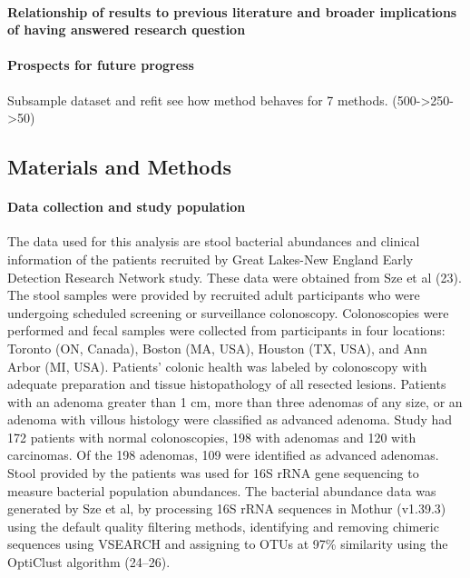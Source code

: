\documentclass[11pt,]{article}
\let\oldparagraph\paragraph
\renewcommand{\paragraph}[1]{\oldparagraph{#1}\mbox{}}
\begin{document}
\paragraph{Relationship of results to previous literature and broader
implications of having answered research
question}\label{relationship-of-results-to-previous-literature-and-broader-implications-of-having-answered-research-question}

\paragraph{Prospects for future
progress}\label{prospects-for-future-progress}

Subsample dataset and refit see how method behaves for 7 methods.
(500-\textgreater{}250-\textgreater{}50)

\subsection{Materials and Methods}\label{materials-and-methods}

\paragraph{Data collection and study
population}\label{data-collection-and-study-population}

The data used for this analysis are stool bacterial abundances and
clinical information of the patients recruited by Great Lakes-New
England Early Detection Research Network study. These data were obtained
from Sze et al (23). The stool samples were provided by recruited adult
participants who were undergoing scheduled screening or surveillance
colonoscopy. Colonoscopies were performed and fecal samples were
collected from participants in four locations: Toronto (ON, Canada),
Boston (MA, USA), Houston (TX, USA), and Ann Arbor (MI, USA). Patients'
colonic health was labeled by colonoscopy with adequate preparation and
tissue histopathology of all resected lesions. Patients with an adenoma
greater than 1 cm, more than three adenomas of any size, or an adenoma
with villous histology were classified as advanced adenoma. Study had
172 patients with normal colonoscopies, 198 with adenomas and 120 with
carcinomas. Of the 198 adenomas, 109 were identified as advanced
adenomas. Stool provided by the patients was used for 16S rRNA gene
sequencing to measure bacterial population abundances. The bacterial
abundance data was generated by Sze et al, by processing 16S rRNA
sequences in Mothur (v1.39.3) using the default quality filtering
methods, identifying and removing chimeric sequences using VSEARCH and
assigning to OTUs at 97\% similarity using the OptiClust algorithm
(24--26).
\end{document}
